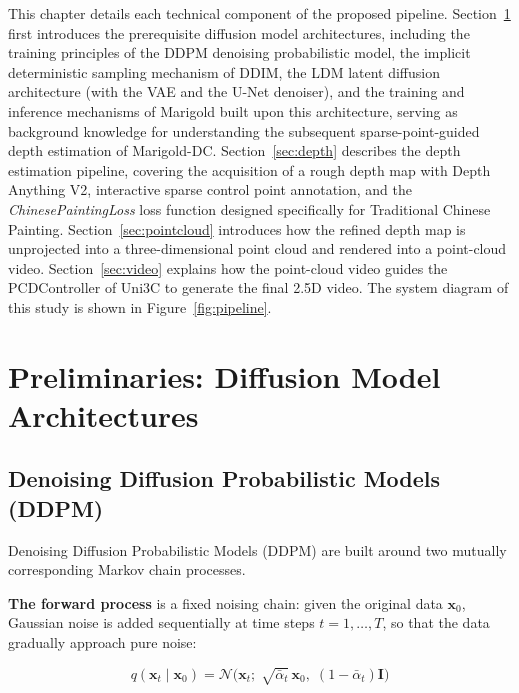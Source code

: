 \hspace{24pt}

This chapter details each technical component of the proposed pipeline.
Section~\ref{sec:prerequisite} first introduces the prerequisite diffusion model architectures,
including the training principles of the DDPM denoising probabilistic model, the implicit deterministic sampling mechanism of DDIM,
the LDM latent diffusion architecture (with the VAE and the U-Net denoiser),
and the training and inference mechanisms of Marigold built upon this architecture,
serving as background knowledge for understanding the subsequent sparse-point-guided depth estimation of Marigold-DC.
Section~\ref{sec:depth} describes the depth estimation pipeline,
covering the acquisition of a rough depth map with Depth Anything V2\cite{depthanythingv2}, interactive sparse control point annotation,
and the \textit{ChinesePaintingLoss} loss function designed specifically for Traditional Chinese Painting.
Section~\ref{sec:pointcloud} introduces how the refined depth map is unprojected into a three-dimensional point cloud and rendered into a point-cloud video.
Section~\ref{sec:video} explains how the point-cloud video guides the PCDController of Uni3C to generate the final 2.5D video.
The system diagram of this study is shown in Figure~\ref{fig:pipeline}.

\section{Preliminaries: Diffusion Model Architectures}
\label{sec:prerequisite}

\subsection{Denoising Diffusion Probabilistic Models (DDPM)}

Denoising Diffusion Probabilistic Models (DDPM) \cite{ddpm}
are built around two mutually corresponding Markov chain processes.

\textbf{The forward process} is a fixed noising chain:
given the original data $\mathbf{x}_0$,
Gaussian noise is added sequentially at time steps $t = 1, \ldots, T$,
so that the data gradually approach pure noise:

\begin{equation}
  q(\mathbf{x}_t \mid \mathbf{x}_0) =
    \mathcal{N}\!\bigl(\mathbf{x}_t;\;\sqrt{\bar{\alpha}_t}\,\mathbf{x}_0,\;(1-\bar{\alpha}_t)\mathbf{I}\bigr)
\end{equation}

